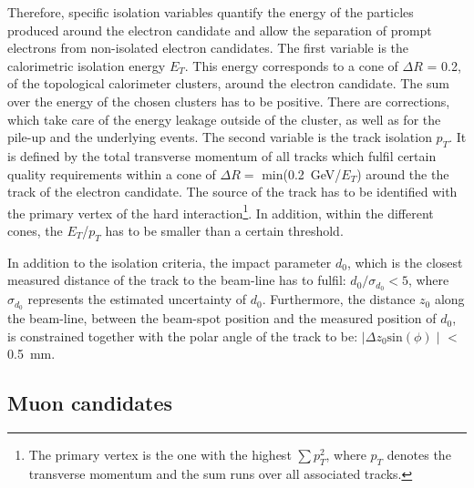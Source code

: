  Therefore, specific isolation variables quantify the energy of the particles produced around the electron candidate and allow the separation of prompt electrons from non-isolated electron candidates.  The first variable is  the calorimetric isolation energy $E_T$.  This energy corresponds to a cone of  $\Delta R$ = 0.2, of the  topological calorimeter clusters, around the electron candidate. The sum over the energy of the chosen clusters has to be positive. There are corrections, which take care of the energy leakage outside of the cluster, as well as for the pile-up and the underlying events. The second variable is the track isolation $p_T$. It is defined by the total transverse momentum of all tracks which fulfil  certain quality requirements within a cone of $\Delta R =$ min(0.2~GeV/$E_T$) around the the track of the electron candidate. The source of the track has to be identified with the primary vertex of the hard interaction\footnote{The primary vertex is the one  with the highest   $\sum p_T^2$, where  $p_T$ denotes the transverse momentum and the sum runs over all associated  tracks.}. In addition, within the different cones, the $E_T$/$p_T$ has to be smaller than a certain threshold.~\cite{ATLAS:2016iqc}

 In addition to the isolation criteria, the impact parameter $d_0$, which is the closest measured distance of the track to the beam-line has to fulfil: $d_0/\sigma_{d_0} <5$, where  $\sigma_{d_0}$ represents the estimated uncertainty of $d_0$. Furthermore, the distance $z_0$ along the beam-line, between the beam-spot position and the measured position of $d_0$,  is constrained together with the polar angle of the track to be: $\mid \Delta z_0 \text{sin}(\phi) \mid$ < 0.5~mm. ~\cite{ATLAS:2016iqc}







\subsection{Muon candidates}

